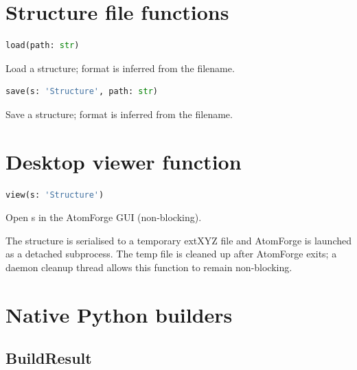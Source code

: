\section{Structure file functions}

\begin{samepage}

\begin{lstlisting}[language=Python]
load(path: str)
\end{lstlisting}

Load a structure; format is inferred from the filename.

\end{samepage}



\begin{samepage}

\begin{lstlisting}[language=Python]
save(s: 'Structure', path: str)
\end{lstlisting}

Save a structure; format is inferred from the filename.

\end{samepage}



\section{Desktop viewer function}

\begin{samepage}

\begin{lstlisting}[language=Python]
view(s: 'Structure')
\end{lstlisting}

Open s in the AtomForge GUI (non-blocking).

The structure is serialised to a temporary extXYZ file and AtomForge is
launched as a detached subprocess.  The temp file is cleaned up after
AtomForge exits; a daemon cleanup thread allows this function to remain
non-blocking.

\end{samepage}



\section{Native Python builders}

\subsection{BuildResult}

